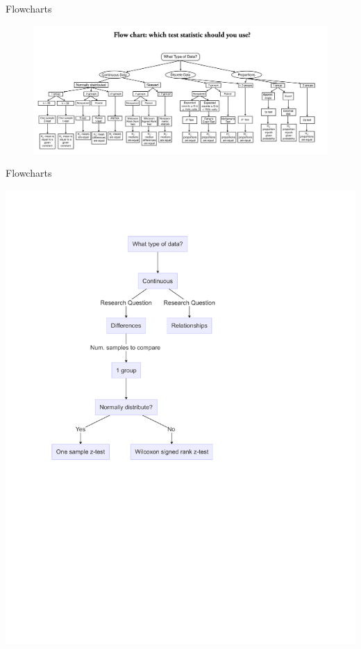 \documentclass[
  ignorenonframetext,
]{beamer}
\begin{document}
\begin{frame}{Flowcharts}
\label{flowcharts-1}
\begin{figure}

{\centering \includegraphics[width=1\linewidth]{fig/which_test_flowchart} 

}

\end{figure}
\end{frame}

\begin{frame}{Flowcharts}
\label{flowcharts-2}
\begin{center}\includegraphics{Inferential-Stat-and-Z-test_files/figure-beamer/figure_1-1} \end{center}
\end{frame}
\end{document}
